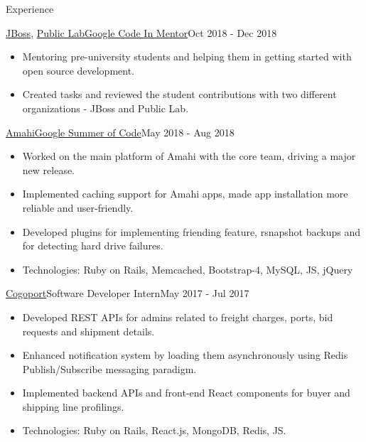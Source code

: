 \documentclass[]{mcdowellcv}
\begin{document}
	\makeheader
	
	\begin{cvsection}{Experience}
		\begin{cvsubsection}{\href {https://github.com/JBossOutreach}{JBoss}, \href {https://github.com/publiclab}{Public Lab}}{\href {https://codein.withgoogle.com/}{Google Code In Mentor}}{Oct 2018 - Dec 2018}
			\begin{itemize}
				\item Mentoring pre-university students and helping them in getting started with open source development.
				\item Created tasks and reviewed the student contributions with two different organizations - JBoss and Public Lab.
			\end{itemize}
		\end{cvsubsection}

		\begin{cvsubsection}{\href {https://summerofcode.withgoogle.com/projects/\#6139448354406400}{Amahi}}{\href {https://summerofcode.withgoogle.com/}{Google Summer of Code}}{May 2018 - Aug 2018}
			\begin{itemize}
				\item Worked on the main platform of Amahi with the core team, driving a major new release.
				\item Implemented caching support for Amahi apps, made app installation more reliable and user-friendly.
				\item Developed plugins for implementing friending feature, rsnapshot backups and for detecting hard drive failures.
				\item Technologies: Ruby on Rails,  Memcached, Bootstrap-4, MySQL, JS, jQuery
			\end{itemize}
		\end{cvsubsection}
		\begin{cvsubsection}{\href {http://www.cogoport.com/}{Cogoport}}{Software Developer Intern}{May 2017 - Jul 2017}			
			\begin{itemize}
				\item Developed REST APIs for admins related to freight charges, ports, bid requests and shipment details.
				\item Enhanced notification system by loading them asynchronously using Redis Publish/Subscribe messaging paradigm.
				\item Implemented backend APIs and front-end React components for buyer and shipping line profilings.
				\item Technologies: Ruby on Rails, React.js, MongoDB, Redis, JS.
			\end{itemize}
		\end{cvsubsection}
	\end{cvsection}
	
\end{document}

